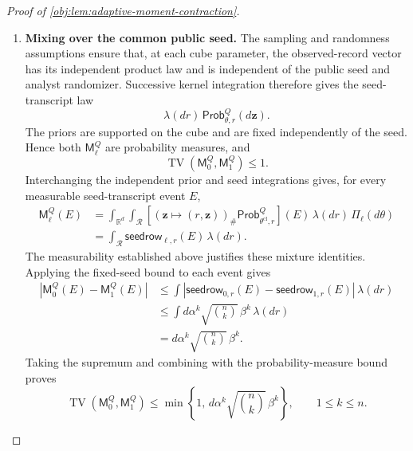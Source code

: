 \documentclass[11pt]{article}
\begin{document}
\begin{proof}[Proof of \cref{obj:lem:adaptive-moment-contraction}]
\begin{enumerate}
\item \textbf{Mixing over the common public seed.}
The sampling and randomness assumptions ensure that, at each cube parameter, the observed-record vector has its independent product law and is independent of the public seed and analyst randomizer. Successive kernel integration therefore gives the seed-transcript law
\[
\lambda(dr)\,\mathsf{Prob}^Q_{\theta,r}(d\mathbf z).
\]
The priors are supported on the cube and are fixed independently of the seed. Hence both \(\mathsf M_\ell^Q\) are probability measures, and
\[
\operatorname{TV}(\mathsf M_0^Q,\mathsf M_1^Q)\le1.
\]
Interchanging the independent prior and seed integrations gives, for every measurable seed-transcript event \(E\),
\[
\begin{split}
\mathsf M_\ell^Q(E)
&=
\int_{\mathbb R^d}\int_{\mathcal R}
 \left[
 (\mathbf z\mapsto(r,\mathbf z))_\#
 \mathsf{Prob}^Q_{\theta^{\mathrm{cl}},r}
 \right](E)\,\lambda(dr)\,\Pi_\ell(d\theta)\\
&=
\int_{\mathcal R}\mathsf{seedrow}_{\ell,r}(E)\,\lambda(dr).
\end{split}
\]
The measurability established above justifies these mixture identities. Applying the fixed-seed bound to each event gives
\[
\begin{split}
|\mathsf M_0^Q(E)-\mathsf M_1^Q(E)|
&\le
\int
 |\mathsf{seedrow}_{0,r}(E)-\mathsf{seedrow}_{1,r}(E)|
 \,\lambda(dr)\\
&\le
\int d\alpha^k\sqrt{\binom nk}\,\beta^k\,\lambda(dr)\\
&=d\alpha^k\sqrt{\binom nk}\,\beta^k.
\end{split}
\]
Taking the supremum and combining with the probability-measure bound proves
\[
\operatorname{TV}(\mathsf M_0^Q,\mathsf M_1^Q)
\le
\min\left\{1,\,
d\alpha^k\sqrt{\binom nk}\,\beta^k\right\},
\qquad 1\le k\le n.
\]


\end{enumerate}
\end{proof}
\end{document}
